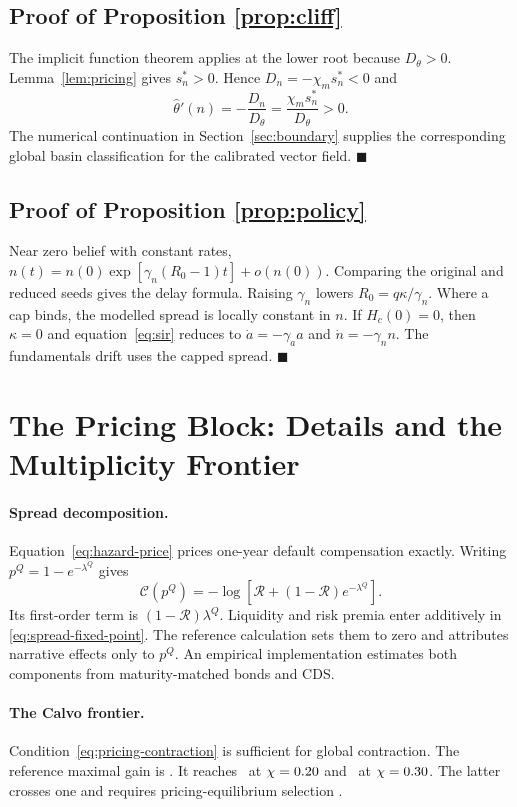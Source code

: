 \documentclass[11pt]{article}
\theoremstyle{definition}
\begin{document}
\subsection{Proof of Proposition \ref{prop:cliff}}
The implicit function theorem applies at the lower root because $D_\theta>0$. Lemma~\ref{lem:pricing} gives $s_n^*>0$. Hence $D_n=-\chi_m s_n^*<0$ and
\[
\hat\theta'(n)=-\frac{D_n}{D_\theta}
=\frac{\chi_m s_n^*}{D_\theta}>0.
\]
The numerical continuation in Section~\ref{sec:boundary} supplies the corresponding global basin classification for the calibrated vector field. $\blacksquare$

\subsection{Proof of Proposition \ref{prop:policy}}
Near zero belief with constant rates, $n(t)=n(0)\exp[\gamma_n(R_0-1)t]+o(n(0))$. Comparing the original and reduced seeds gives the delay formula. Raising $\gamma_n$ lowers $R_0=q\kappa/\gamma_n$. Where a cap binds, the modelled spread is locally constant in $n$. If $H_c(0)=0$, then $\kappa=0$ and equation~\eqref{eq:sir} reduces to $\dot a=-\gamma_a a$ and $\dot n=-\gamma_n n$. The fundamentals drift uses the capped spread. $\blacksquare$

\section{The Pricing Block: Details and the Multiplicity Frontier}\label{app:pricing}

\paragraph{Spread decomposition.} Equation~\eqref{eq:hazard-price} prices one-year default compensation exactly. Writing $p^Q=1-e^{-\lambda^Q}$ gives
\[
\mathcal C(p^Q)=-\log\left[\mathcal R+(1-\mathcal R)e^{-\lambda^Q}\right].
\]
Its first-order term is $(1-\mathcal R)\lambda^Q$. Liquidity and risk premia enter additively in \eqref{eq:spread-fixed-point}. The reference calculation sets them to zero and attributes narrative effects only to $p^Q$. An empirical implementation estimates both components from maturity-matched bonds and CDS.

\paragraph{The Calvo frontier.} Condition~\eqref{eq:pricing-contraction} is sufficient for global contraction. The reference maximal gain is \GainMax. It reaches \GainChiHi\ at $\chi=0.20$ and \GainChiBoundary\ at $\chi=0.30$. The latter crosses one and requires pricing-equilibrium selection \citep{Calvo1988,AguiarEtAl2022}.
\end{document}
